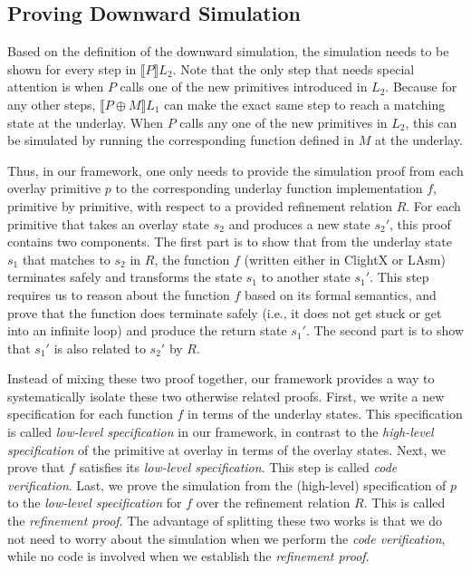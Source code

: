 \subsection{Proving Downward Simulation}

Based on the definition of the downward simulation, the simulation needs
to be shown for every step in $\llbracket{}P\rrbracket{}L_2$.
Note that the only step that needs special
attention is when $P$ calls one of the new primitives introduced in $L_2$.
Because for any other
steps, $\llbracket{}{P \oplus M}\rrbracket{}L_1$ can make the exact same step
to reach a matching state at the underlay.
When $P$ calls any one of the new primitives in $L_2$, this can be simulated
by running the corresponding function defined in $M$ at the underlay.

Thus, in our framework, one only needs to provide the simulation proof
from each overlay primitive $p$ to the corresponding underlay function
implementation $f$, primitive by primitive, with respect to a provided
refinement relation $R$. For each primitive that takes an overlay state
$s_2$ and produces a new state $s_2'$, this proof contains two components.
The first part is to show that from the underlay state $s_1$ that matches to
$s_2$ in $R$, the function $f$ (written either in ClightX or LAsm)
terminates safely and transforms the state $s_1$ to another state $s_1'$.
This step requires us to reason about the function $f$ based on its formal
semantics, and prove that the function does terminate safely (i.e., it
does not get stuck or get into an infinite loop) and produce the return state
$s_1'$. The second part is to show that $s_1'$ is also related to $s_2'$ by $R$.

Instead of mixing these two proof together, our framework provides a way to
systematically isolate these two otherwise related proofs. First, we write
a new specification for each function $f$ in terms of the underlay states.
This specification is called {\em low-level specification} in our framework,
in contrast to the {\em high-level specification} of the primitive at overlay
in terms of the overlay states. Next, we prove that $f$ satisfies its
{\em low-level specification}. This step is called {\em code verification}.
Last, we prove the simulation from the (high-level) specification of $p$ to the
{\em low-level specification} for $f$ over the refinement relation $R$.
This is called the {\em refinement proof}. The advantage of splitting these
two works is that we do not need to worry about the simulation when we
perform the {\em code verification}, while no code is involved when
we establish the {\em refinement proof}.

